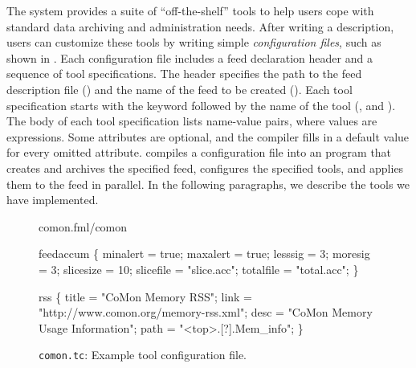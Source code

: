 The \padsd{} system provides a suite of ``off-the-shelf'' tools to
help users cope with standard data archiving and
administration needs.  After writing
a \padsd{} description, users can customize these tools by
writing simple {\em configuration files}, such as shown in
.   
Each configuration file includes a feed declaration header 
and a sequence of tool specifications. The header specifies the path to the 
feed description file () and the name of the feed to be created ().
Each tool specification starts with the keyword  followed by the
name of the tool (\eg{},  and ). The body of each tool specification 
lists name-value pairs, where values are \ocaml{} expressions. Some attributes are 
optional, and the compiler fills in a default value for every omitted attribute.
\padsd{} compiles a configuration file into an \ocaml{} program that creates and archives the specified 
feed, configures the specified tools, and applies them to the feed in parallel.
In the following paragraphs, we describe the tools we have implemented.

\begin{figure}[t]
\centering
\begin{codebox}
 comon.fml/comon

 feedaccum
\{
  minalert  = true;
  maxalert  = true;
  lesssig   = 3;
  moresig   = 3;
  slicesize = 10;
  slicefile = "slice.acc";
  totalfile = "total.acc";
\}

 rss
\{
  title = "CoMon Memory RSS";
  link  = "http://www.comon.org/memory-rss.xml";
  desc  = "CoMon Memory Usage Information";
  path  = "<top>.[?].Mem_info";
\}
\end{codebox}
\caption{\texttt{comon.tc}: Example tool configuration file.}
\label{fig:toolconfigs}
\end{figure}






